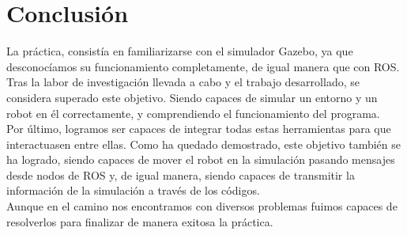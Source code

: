 \documentclass[11pt,a4paper,oldfontcommands,oneside]{memoir}
\begin{document}
\chapter{Conclusión}
La práctica, consistía en familiarizarse con el simulador Gazebo, ya que desconocíamos su funcionamiento completamente, de igual manera que con ROS. Tras la labor de investigación llevada a cabo y el trabajo desarrollado, se considera superado este objetivo. Siendo capaces de simular un entorno y un robot en él correctamente, y comprendiendo el funcionamiento del programa.\\

Por último, logramos ser capaces de integrar todas estas herramientas para que interactuasen entre ellas. Como ha quedado demostrado, este objetivo también se ha logrado, siendo capaces de mover el robot en la simulación pasando mensajes desde nodos de ROS y, de igual manera, siendo capaces de transmitir la información de la simulación a través de los códigos.\\

Aunque en el camino nos encontramos con diversos problemas fuimos capaces de resolverlos para finalizar de manera exitosa la práctica.




\hfill


\end{document}
